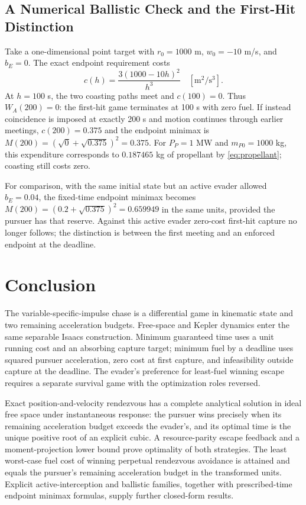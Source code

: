 \documentclass[journal,a4paper]{IEEEtran}
\begin{document}
\subsection{A Numerical Ballistic Check and the First-Hit Distinction}
Take a one-dimensional point target with $r_0=1000$ m, $w_0=-10$ m/s,
and $b_E=0$. The exact endpoint requirement costs
\begin{equation}
 c(h)=\frac{3(1000-10h)^2}{h^3}\quad[\mathrm{m^2/s^3}].
\end{equation}
At $h=100$ s, the two coasting paths meet and $c(100)=0$. Thus
$W_A(200)=0$: the first-hit game terminates at 100 s with zero fuel.
If instead coincidence is imposed at exactly 200 s and motion continues
through earlier meetings, $c(200)=0.375$ and the endpoint minimax is
$M(200)=(\sqrt0+\sqrt{0.375})^2=0.375$.
For $P_P=1$ MW and $m_{P0}=1000$ kg, this expenditure corresponds to
$0.187465$ kg of propellant by \eqref{eq:propellant}; coasting still costs zero.

For comparison, with the same initial state but an active evader allowed
$b_E=0.04$, the fixed-time endpoint minimax becomes
$M(200)=(0.2+\sqrt{0.375})^2=0.659949$ in the same units, provided
the pursuer has that reserve. Against this active evader zero-cost first-hit capture no longer
follows; the distinction is between the first meeting and an enforced
endpoint at the deadline.

\section{Conclusion}
The variable-specific-impulse chase is a differential game in kinematic state and two remaining acceleration budgets. Free-space and Kepler dynamics enter the same separable Isaacs construction. Minimum guaranteed time uses a unit running cost and an absorbing capture target; minimum fuel by a deadline uses squared pursuer acceleration, zero cost at first capture, and infeasibility outside capture at the deadline. The evader's preference for least-fuel winning escape requires a separate survival game with the optimization roles reversed.

Exact position-and-velocity rendezvous has a complete analytical solution in ideal free space under instantaneous response: the pursuer wins precisely when its remaining acceleration budget exceeds the evader's, and its optimal time is the unique positive root of an explicit cubic. A resource-parity escape feedback and a moment-projection lower bound prove optimality of both strategies. The least worst-case fuel cost of winning perpetual rendezvous avoidance is attained and equals the pursuer's remaining acceleration budget in the transformed units. Explicit active-interception and ballistic families, together with prescribed-time endpoint minimax formulas, supply further closed-form results.
\end{document}
